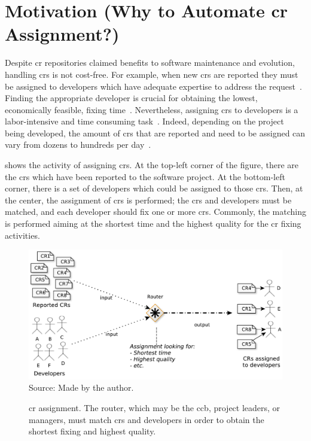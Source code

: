 \section[Motivation  (Why to Automate CR Assignment?)]{Motivation (Why to
Automate \ac{cr} Assignment?)}

Despite \ac{cr} repositories claimed benefits to software maintenance and
evolution, handling \acp{cr} is not cost-free. For example, when new \acp{cr}
are reported they must be assigned to developers which have adequate expertise
to address the request~\citep{Aljarah2011,Hosseini2012,Kagdi2012}. Finding the
appropriate developer is crucial for obtaining the lowest, economically
feasible, fixing time~\citep{Lucca2002}. Nevertheless, assigning \acp{cr} to
developers is a labor-intensive and time consuming
task~\citep{Anvik2006,Jeong2009}. Indeed, depending on the project being
developed, the amount of \acp{cr} that are reported and need to be assigned can
vary from dozens to hundreds per day~\citep{CavalcantiSQJ2011}.

 shows the activity of assigning \acp{cr}.
At the top-left corner of the figure, there are the \acp{cr} which have been
reported to the software project. At the bottom-left corner, there is a set of
developers which could be assigned to those \acp{cr}. Then, at the center, the
assignment of \acp{cr} is performed; the \acp{cr} and developers must be
matched, and each developer should fix one or more \acp{cr}. Commonly, the
matching is performed aiming at the shortest time and the highest quality for
the \ac{cr} fixing activities.

\begin{figure}[htp]
\centering
  \caption[\ac{cr} assignment.]{\ac{cr} assignment. The router, which may be the
  \acs{ccb}, project leaders, or managers, must match \acp{cr} and developers in
  order to obtain the shortest fixing and highest quality.}
  \includegraphics[width=\columnwidth]{images/assignment-schema.pdf}
  \footnotesize{Source: Made by the author.}
  \label{fig:assignment-schema}
\end{figure}


